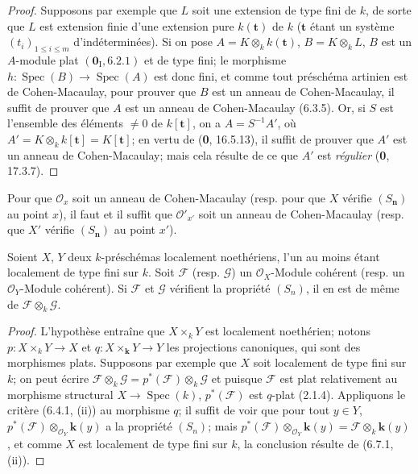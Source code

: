 \begin{proof}
Supposons par exemple que $L$ soit une extension de type fini de $k$,
de sorte que $L$ est extension finie d'une extension pure $k(\mathbf t)$
de $k$ ($\mathbf t$ étant un système $(t_i)_{1\leqslant i\leqslant m}$
d'indéterminées). Si on pose $A=K\otimes_k k(\mathbf t)$,
$B=K\otimes_k L$, $B$ est un $A$-module plat $(\mathbf{0}_{\mathrm I},6.2.1)$ et de type fini;
le morphisme $h:\operatorname{Spec}(B)\to\operatorname{Spec}(A)$ est
donc fini, et comme tout préschéma artinien est de Cohen-Macaulay, pour
prouver que $B$ est un anneau de Cohen-Macaulay, il suffit de prouver que
$A$ est un anneau de Cohen-Macaulay (6.3.5). Or, si $S$ est l'ensemble
des éléments $\neq 0$ de $k[\mathbf t]$, on a $A=S^{-1}A'$, où
$A'=K\otimes_k k[\mathbf t]=K[\mathbf t]$; en vertu de
(\textbf{0}, 16.5.13), il suffit de prouver que $A'$ est un anneau de
Cohen-Macaulay; mais cela résulte de ce que $A'$ est \emph{régulier} (\textbf{0}, 17.3.7).
\end{proof}

\begin{corollary}[6.7.2]
Pour que $\mathcal O_x$ soit un anneau de Cohen-Macaulay \textup{(resp.} pour
que $X$ vérifie $(S_{\boldsymbol{n}})$ au point $x$), il faut et il suffit
que $\mathcal O'_{x'}$ soit un anneau de Cohen-Macaulay \textup{(resp.} que $X'$
vérifie $(S_{\boldsymbol{n}})$ au point $x'$).
\end{corollary}

\begin{corollary}[6.7.3]
\label{IV.2.s6.7.3-fr}
Soient $X$, $Y$ deux $k$-préschémas localement noethériens, l'un au
moins étant localement de type fini sur $k$. Soit $\mathscr F$ \textup{(resp.}
$\mathscr G$) un $\mathcal O_X$-Module cohérent \textup{(resp.} un
$\mathcal O_Y$-Module cohérent). Si $\mathscr F$ et $\mathscr G$
vérifient la propriété $(S_n)$, il en est de même de
$\mathscr F\otimes_k\mathscr G$.
\end{corollary}

\begin{proof}
L'hypothèse entraîne que $X\times_kY$ est localement noethérien; notons
$p:X\times_kY\to X$ et $q:X\times_{\boldsymbol k}Y\to Y$ les projections canoniques,
qui sont des morphismes plats. Supposons par exemple que $X$ soit
localement de type fini sur $k$; on peut écrire
$\mathscr F\otimes_k\mathscr G=p^*(\mathscr F)\otimes_k\mathscr G$
et puisque $\mathscr F$ est plat relativement au morphisme structural
$X\to\operatorname{Spec}(k)$, $p^*(\mathscr F)$ est $q$-plat (2.1.4).
Appliquons le critère (6.4.1, (ii)) au morphisme $q$; il suffit de voir
que pour tout $y\in Y$, $p^*(\mathscr F)\otimes_{\mathcal O_Y}\boldsymbol{k}(y)$
a la propriété $(S_n)$; mais
$p^*(\mathscr F)\otimes_{\mathcal O_Y}\boldsymbol{k}(y)=\mathscr F\otimes_k \boldsymbol{k}(y)$,
et comme $X$ est localement de type fini sur $k$, la conclusion résulte
de (6.7.1, (ii)).
\end{proof}

